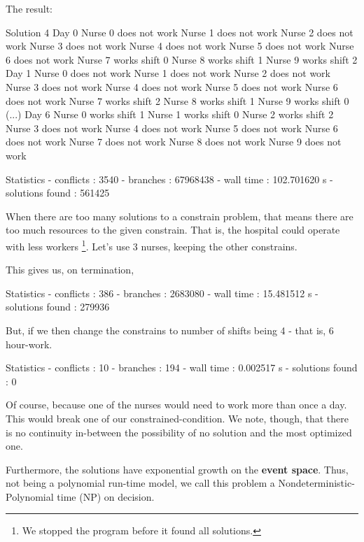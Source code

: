 \documentclass[
12pt,				%
openright,			%
oneside,			%
a4paper,			%
brazil,				%
english,			%
]{abntex2}
\begin{document}
The result:
\begin{python}
Solution 4
Day 0
  Nurse 0 does not work
  Nurse 1 does not work
  Nurse 2 does not work
  Nurse 3 does not work
  Nurse 4 does not work
  Nurse 5 does not work
  Nurse 6 does not work
  Nurse 7 works shift 0
  Nurse 8 works shift 1
  Nurse 9 works shift 2
Day 1
  Nurse 0 does not work
  Nurse 1 does not work
  Nurse 2 does not work
  Nurse 3 does not work
  Nurse 4 does not work
  Nurse 5 does not work
  Nurse 6 does not work
  Nurse 7 works shift 2
  Nurse 8 works shift 1
  Nurse 9 works shift 0
(...)
Day 6
  Nurse 0 works shift 1
  Nurse 1 works shift 0
  Nurse 2 works shift 2
  Nurse 3 does not work
  Nurse 4 does not work
  Nurse 5 does not work
  Nurse 6 does not work
  Nurse 7 does not work
  Nurse 8 does not work
  Nurse 9 does not work

Statistics
  - conflicts       : 3540
  - branches        : 67968438
  - wall time       : 102.701620 s
  - solutions found : 561425
\end{python}

When there are too many solutions to a constrain problem, that means
there are too much resources to the given constrain. That is, the
hospital could operate with less workers \footnote{We stopped the
  program before it found all solutions.}. Let's use 3 nurses, keeping
the other constrains.

This gives us, on termination,
\begin{python}
Statistics
  - conflicts       : 386
  - branches        : 2683080
  - wall time       : 15.481512 s
  - solutions found : 279936
\end{python}

But, if we then change the constrains to number of shifts being 4 -
that is, 6 hour-work.

\begin{python}
Statistics
  - conflicts       : 10
  - branches        : 194
  - wall time       : 0.002517 s
  - solutions found : 0
\end{python}
Of course, because one of the nurses would need to work more than once
a day. This would break one of our constrained-condition. We note, though, that there is no continuity in-between the possibility of no solution and the most optimized one. 

Furthermore, the solutions have exponential growth on the \textbf{event space}. Thus, not being a polynomial run-time model, we call this problem a Nondeterministic-Polynomial time (NP) on decision.
\end{document}
